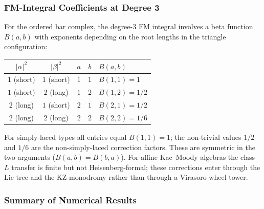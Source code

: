 \subsubsection*{FM-Integral Coefficients at Degree 3}

For the ordered bar complex, the degree-$3$ FM integral involves
a beta function $B(a,b)$ with exponents depending on the root lengths
in the triangle configuration:

\begin{center}
\begin{tabular}{ccccl}
\toprule
$|\alpha|^2$ & $|\beta|^2$ & $a$ & $b$ & $B(a,b)$ \\
\midrule
$1$ (short) & $1$ (short) & $1$ & $1$ & $B(1,1) = 1$ \\
$1$ (short) & $2$ (long) & $1$ & $2$ & $B(1,2) = 1/2$ \\
$2$ (long) & $1$ (short) & $2$ & $1$ & $B(2,1) = 1/2$ \\
$2$ (long) & $2$ (long) & $2$ & $2$ & $B(2,2) = 1/6$ \\
\bottomrule
\end{tabular}
\end{center}

\noindent For simply-laced types all entries equal $B(1,1) = 1$; the non-trivial
values $1/2$ and $1/6$ are the non-simply-laced correction factors.
These are symmetric in the two arguments ($B(a,b) = B(b,a)$).
For affine Kac--Moody algebras the class-$L$ transfer is finite but not
Heisenberg-formal; these corrections enter through the Lie tree and the
KZ monodromy rather than through a Virasoro wheel tower.

\subsubsection*{Summary of Numerical Results}

